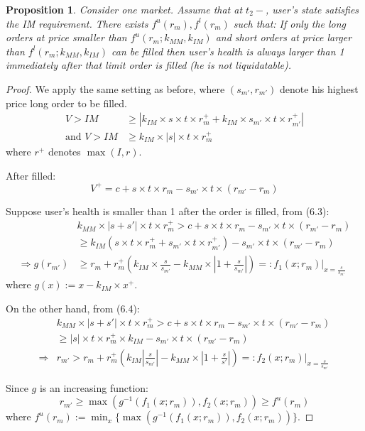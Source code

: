 \documentclass[notitlepage,reqno,11pt]{amsart}
\numberwithin{equation}{section}
\newtheorem{prop}{Proposition}[section]
\newcommand{\RA}{\Rightarrow}
\begin{document}
\begin{prop}\label{core-limit-range}
    Consider one market. Assume that at $t_2-$, user's state satisfies the IM requirement. There exists $f^u(r_m),f^l(r_m)$ such that: If only the long orders at price smaller than $f^u(r_m;k_{MM},k_{IM})$ and short orders at price larger than $f^l(r_m;k_{MM},k_{IM})$ can be filled then user's health is always larger than 1 immediately after that limit order is filled (he is not liquidatable).  
\end{prop}
\begin{proof}
    
We apply the same setting as before, where $(s_{m'},r_{m'})$ denote his highest price long order to be filled. 
    \begin{align}
    V >  IM&\geq |k_{IM}\times s\times t\times r_m^+ + k_{IM}\times s_{m'}\times t\times r_{m'}^+|\\
    \text{and } V >  IM&\geq k_{IM}\times |s|\times t\times r_m^+
    \end{align}
where $r^+$ denotes $\max(I, r)$.

After filled:
$$
V^+ = c + s\times t\times r_m - s_{m'}\times t\times (r_{m'}-r_m)
$$

Suppose user's health is smaller than 1 after the order is filled, from (6.3):
\begin{align*}
& k_{MM}\times |s+s'|\times t\times r_m^+> c + s\times t\times r_m - s_{m'}\times t\times (r_{m'}-r_m) \\
&\geq k_{IM}(s\times t\times r_m^+ + s_{m'}\times t\times r_{m'}^+)  - s_{m'}\times t\times (r_{m'}-r_m)\\
\RA g(r_{m'}) &\geq r_m + r_m^+(k_{IM}\times \frac{s}{s_{m'}} -k_{MM}\times|1+\frac{s}{s_{m'}}|) =: f_1(x;r_m)|_{x=\frac{s}{s_{m'}}}
\end{align*}
where $g(x) := x - k_{IM}\times x^+$.

On the other hand, from (6.4):
\begin{align*}
& k_{MM}\times |s+s'|\times t\times r_m^+ > c + s\times t\times r_m - s_{m'}\times t\times (r_{m'}-r_m) \\
&\geq |s|\times t\times r_m^+\times k_{IM} - s_{m'}\times t\times (r_{m'}-r_m)\\
\RA & r_{m'} > r_m + r_m^+(k_{IM}|\frac{s}{s_{m'}}| -  k_{MM}\times|1+\frac{s}{s'}|) =: f_2(x;r_m)|_{x=\frac{s}{s_{m'}}}
\end{align*}

Since $g$ is an increasing function:
$$
r_{m'} \geq \max(g^{-1}(f_1(x;r_m)), f_2(x;r_m)) \geq f^u(r_m)
$$
where $f^u(r_m) := \min_x\{\max(g^{-1}(f_1(x;r_m)), f_2(x;r_m))\}$. 


\end{proof}
\end{document}
